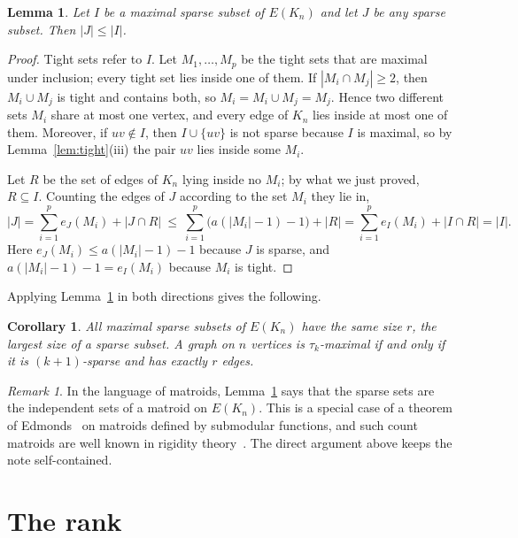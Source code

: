 \documentclass[11pt]{amsart}
\newtheorem{lemma}[theorem]{Lemma}
\newtheorem{corollary}[theorem]{Corollary}
\theoremstyle{definition}
\theoremstyle{remark}
\newtheorem{remark}[theorem]{Remark}
\numberwithin{equation}{section}
\begin{document}
\begin{lemma}\label{lem:exchange}
Let $I$ be a maximal sparse subset of $E(K_n)$ and let $J$ be any sparse subset. Then $|J|\le|I|$.
\end{lemma}

\begin{proof}
Tight sets refer to $I$. Let $M_1,\dots,M_p$ be the tight sets that are maximal under inclusion; every tight set lies inside one of them. If $|M_i\cap M_j|\ge2$, then $M_i\cup M_j$ is tight and contains both, so $M_i=M_i\cup M_j=M_j$. Hence two different sets $M_i$ share at most one vertex, and every edge of $K_n$ lies inside at most one of them. Moreover, if $uv\notin I$, then $I\cup\{uv\}$ is not sparse because $I$ is maximal, so by Lemma~\ref{lem:tight}(iii) the pair $uv$ lies inside some $M_i$.

Let $R$ be the set of edges of $K_n$ lying inside no $M_i$; by what we just proved, $R\subseteq I$. Counting the edges of $J$ according to the set $M_i$ they lie in,
\[
|J|=\sum_{i=1}^p e_J(M_i)+|J\cap R|\ \le\ \sum_{i=1}^p\bigl(a(|M_i|-1)-1\bigr)+|R|=\sum_{i=1}^p e_I(M_i)+|I\cap R|=|I| .
\]
Here $e_J(M_i)\le a(|M_i|-1)-1$ because $J$ is sparse, and $a(|M_i|-1)-1=e_I(M_i)$ because $M_i$ is tight.
\end{proof}

Applying Lemma~\ref{lem:exchange} in both directions gives the following.

\begin{corollary}\label{cor:same}
All maximal sparse subsets of $E(K_n)$ have the same size $r$, the largest size of a sparse subset. A graph on $n$ vertices is $\tau_k$-maximal if and only if it is $(k+1)$-sparse and has exactly $r$ edges.
\end{corollary}

\begin{remark}
In the language of matroids, Lemma~\ref{lem:exchange} says that the sparse sets are the independent sets of a matroid on $E(K_n)$. This is a special case of a theorem of Edmonds~\cite{Edmonds} on matroids defined by submodular functions, and such count matroids are well known in rigidity theory~\cite{LS,Whiteley}. The direct argument above keeps the note self-contained.
\end{remark}

\section{The rank}\label{sec:rank}
\end{document}
